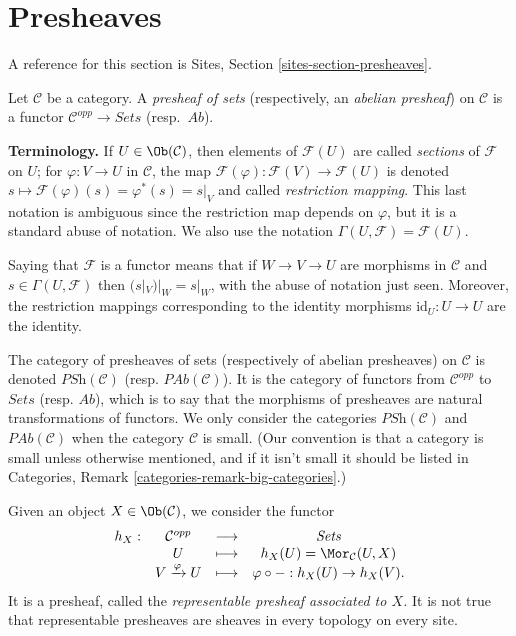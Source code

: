 \section{Presheaves}
\label{section-presheaves}

\noindent
A reference for this section is
Sites, Section \ref{sites-section-presheaves}.

\begin{definition}
\label{definition-presheaf}
Let $\mathcal{C}$ be a category. A {\it presheaf of sets} (respectively, an
{\it abelian presheaf}) on $\mathcal{C}$ is a functor $\mathcal{C}^{opp} \to
\textit{Sets}$ (resp.\ $\textit{Ab}$).
\end{definition}

\noindent
{\bf Terminology.} If $U \in \Ob(\mathcal{C})$, then elements of
$\mathcal{F}(U)$ are called {\it sections} of $\mathcal{F}$ on
$U$; for $\varphi: V \to U$ in $\mathcal{C}$, the
map $\mathcal{F}(\varphi) : \mathcal{F}(V) \to
\mathcal{F}(U)$ is denoted $s \mapsto \mathcal{F}(\varphi) (s) =
\varphi^* (s) = s |_V $ and called {\it restriction mapping}. This
last notation is ambiguous since the restriction map depends on $\varphi$, but
it is a standard abuse of notation. We also use the notation
$\Gamma(U, \mathcal{F}) = \mathcal{F}(U)$.

\medskip\noindent
Saying that $\mathcal{F}$ is a functor means that if
$W \to V \to U$ are morphisms in $\mathcal{C}$ and
$s \in \Gamma(U, \mathcal{F})$ then
$(s|_V)|_W = s |_W$, with the abuse of
notation just seen. Moreover, the restriction mappings corresponding to
the identity morphisms $\text{id}_U : U \to U$ are the identity.

\medskip\noindent
The category of presheaves of sets (respectively of abelian presheaves) on
$\mathcal{C}$ is denoted $\textit{PSh} (\mathcal{C})$ (resp. $\textit{PAb}
(\mathcal{C})$). It is the category of functors from $\mathcal{C}^{opp}$ to
$\textit{Sets}$ (resp. $\textit{Ab}$), which is to say that the morphisms of
presheaves are natural transformations of functors. We only consider the
categories $\textit{PSh}(\mathcal{C})$ and $\textit{PAb}(\mathcal{C})$
when the category $\mathcal{C}$ is small. (Our convention is that a category
is small unless otherwise mentioned, and if it isn't small it should be
listed in Categories, Remark \ref{categories-remark-big-categories}.)

\begin{example}
\label{example-representable-presheaf}
Given an object $X \in \Ob(\mathcal{C})$, we consider the functor
$$
\begin{matrix}
h_X : & \mathcal{C}^{opp} & \longrightarrow & \textit{Sets} \\
& U & \longmapsto & h_X(U) = \Mor_\mathcal{C}(U, X) \\
& V \xrightarrow{\varphi} U & \longmapsto &
\varphi \circ - : h_X(U) \to h_X(V).
\end{matrix}
$$
It is a presheaf, called the {\it representable presheaf associated to $X$.}
It is not true that representable presheaves are sheaves in every topology on
every site.
\end{example}


